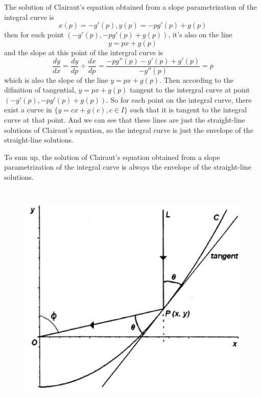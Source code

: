 \documentclass[a4paper,12pt,titlepage]{article}
\begin{document}
\section{}
The solution of Clairaut's equation obtained from a slope parametrization of the integral curve is 
$$x(p)=-g'(p),y(p)=-pg'(p)+g(p)$$
then for each point $(-g'(p),-pg'(p)+g(p))$, it's also on the line
$$y=px+g(p)$$
and the slope at this point of the intergral curve is
$$\dfrac{dy}{dx}=\dfrac{dy}{dp}\div\dfrac{dx}{dp}=\dfrac{-pg''(p)-g'(p)+g'(p)}{-g''(p)}=p$$
which is also the slope of the line $y=px+g(p)$. Then according to the difinition of tangential, $y=px+g(p)$ tangent to the intergral curve at point $(-g'(p),-pg'(p)+g(p))$. So for each point on the integral curve, there exist a curve in $\lbrace y=cx+g(c),c\in I\rbrace$ such that it is tangent to the integral curve at that point. And we can see that these lines are just the straight-line solutions of Clairaut's equation, so the integral curve is just the envelope of the straight-line solutions.

To sum up, the solution of Clairaut's equation obtained from a slope parametrization of the
integral curve is always the envelope of the straight-line solutions.

\section{}
\begin{figure}[ht]
	\centering
	\includegraphics[height=10cm]{1.png}
 
\end{figure}
\end{document}
